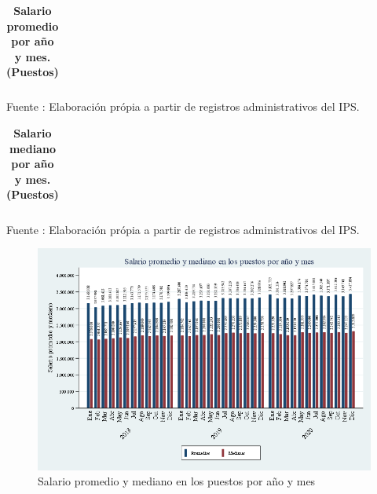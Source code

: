 \begin{table}[H]
\begin{center}
\scriptsize     
\caption{\bf{Salario promedio por año y mes. (Puestos)}}
\begin{tabular}{l|rrrrrrrrrrrrr}

\end{tabular}
                    \item Fuente : Elaboración própia a partir de registros administrativos del IPS.
\end{center}
\end{table}

\begin{table}[H]
\begin{center}
\scriptsize     
\caption{\bf{Salario mediano por año y mes. (Puestos)}}
\begin{tabular}{l|rrrrrrrrrrrrr}

\end{tabular}
                    \item Fuente : Elaboración própia a partir de registros administrativos del IPS.
\end{center}
\end{table}

\begin{figure}[H]
\begin{center}
                    \caption{Salario promedio y mediano en los puestos por año y mes}
                    \vspace{0.5cm}
                    \includegraphics[scale=0.3]{RA_IPS_salprom_mediana_puestos_2010a2020_mes.png}
\end{center}
\end{figure}

